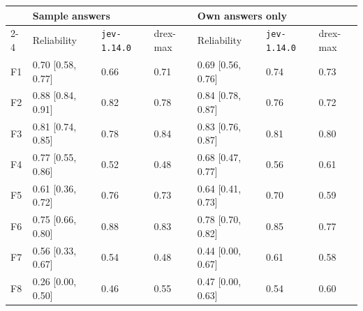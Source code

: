 {\footnotesize
\begin{tabular}{@{}l l l l l l l@{}}
\toprule
 & \multicolumn{3}{l}{Sample answers} & \multicolumn{3}{l}{Own answers only} \\
\cmidrule(r){2-4}\cmidrule{5-7}
 & Reliability & \texttt{jev-1.14.0} & drex-max & Reliability & \texttt{jev-1.14.0} & drex-max \\
\midrule
F1 & 0.70 {\scriptsize[0.58, 0.77]} & 0.66 & 0.71 & 0.69 {\scriptsize[0.56, 0.76]} & 0.74 & 0.73 \\
F2 & 0.88 {\scriptsize[0.84, 0.91]} & 0.82 & 0.78 & 0.84 {\scriptsize[0.78, 0.87]} & 0.76 & 0.72 \\
F3 & 0.81 {\scriptsize[0.74, 0.85]} & 0.78 & 0.84 & 0.83 {\scriptsize[0.76, 0.87]} & 0.81 & 0.80 \\
F4 & 0.77 {\scriptsize[0.55, 0.86]} & 0.52 & 0.48 & 0.68 {\scriptsize[0.47, 0.77]} & 0.56 & 0.61 \\
F5 & 0.61 {\scriptsize[0.36, 0.72]} & 0.76 & 0.73 & 0.64 {\scriptsize[0.41, 0.73]} & 0.70 & 0.59 \\
F6 & 0.75 {\scriptsize[0.66, 0.80]} & 0.88 & 0.83 & 0.78 {\scriptsize[0.70, 0.82]} & 0.85 & 0.77 \\
F7 & 0.56 {\scriptsize[0.33, 0.67]} & 0.54 & 0.48 & 0.44 {\scriptsize[0.00, 0.67]} & 0.61 & 0.58 \\
F8 & 0.26 {\scriptsize[0.00, 0.50]} & 0.46 & 0.55 & 0.47 {\scriptsize[0.00, 0.63]} & 0.54 & 0.60 \\
\bottomrule
\end{tabular}}
